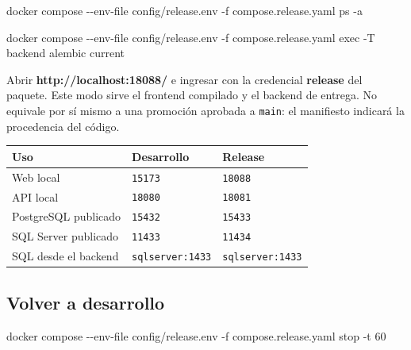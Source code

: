 \documentclass[
  spanish,
  10pt,
  a4paper,
]{article}
\newenvironment{Shaded}{}{}
\newcommand{\AttributeTok}[1]{#1}
\newcommand{\ExtensionTok}[1]{#1}
\newcommand{\NormalTok}[1]{#1}
\renewenvironment{Shaded}{\begin{snugshade}}{\end{snugshade}}%
\begin{document}
\begin{Shaded}
\begin{Highlighting}[]
\ExtensionTok{docker}\NormalTok{ compose }\AttributeTok{{-}{-}env{-}file}\NormalTok{ config/release.env }\AttributeTok{{-}f}\NormalTok{ compose.release.yaml ps }\AttributeTok{{-}a}
\end{Highlighting}
\end{Shaded}

\begin{Shaded}
\begin{Highlighting}[]
\ExtensionTok{docker}\NormalTok{ compose }\AttributeTok{{-}{-}env{-}file}\NormalTok{ config/release.env }\AttributeTok{{-}f}\NormalTok{ compose.release.yaml exec }\AttributeTok{{-}T}\NormalTok{ backend alembic current}
\end{Highlighting}
\end{Shaded}

Abrir \textbf{http://localhost:18088/} e ingresar con la credencial
\textbf{release} del paquete. Este modo sirve el frontend compilado y el
backend de entrega. No equivale por sí mismo a una promoción aprobada a
\texttt{main}: el manifiesto indicará la procedencia del código.

\begin{longtable}[]{@{}lll@{}}
\toprule\noalign{}
Uso & Desarrollo & Release \\
\midrule\noalign{}
\endhead
\bottomrule\noalign{}
\endlastfoot
Web local & \texttt{15173} & \texttt{18088} \\
API local & \texttt{18080} & \texttt{18081} \\
PostgreSQL publicado & \texttt{15432} & \texttt{15433} \\
SQL Server publicado & \texttt{11433} & \texttt{11434} \\
SQL desde el backend & \texttt{sqlserver:1433} &
\texttt{sqlserver:1433} \\
\end{longtable}

\subsection{Volver a desarrollo}\label{volver-a-desarrollo}

\begin{Shaded}
\begin{Highlighting}[]
\ExtensionTok{docker}\NormalTok{ compose }\AttributeTok{{-}{-}env{-}file}\NormalTok{ config/release.env }\AttributeTok{{-}f}\NormalTok{ compose.release.yaml stop }\AttributeTok{{-}t}\NormalTok{ 60}
\end{Highlighting}
\end{Shaded}
\end{document}
